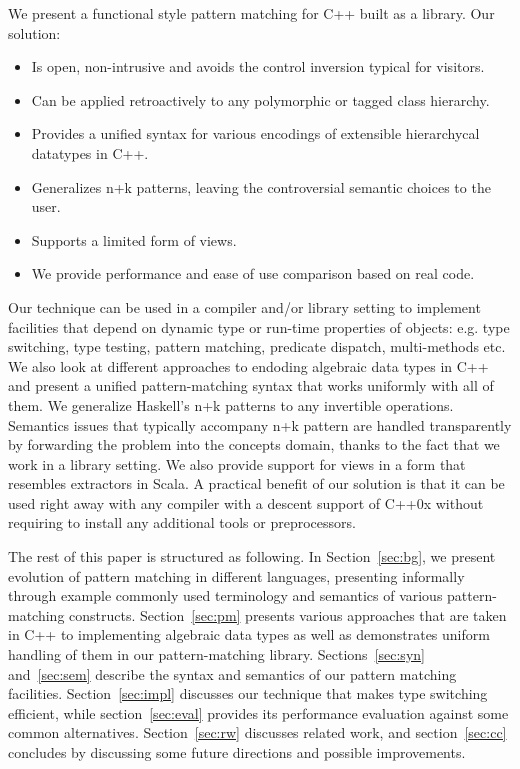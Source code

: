 \documentclass[preprint]{sigplanconf}
\begin{document}
We present a functional style pattern matching for C++ built as a library. Our solution:

  \begin{itemize}
  \item Is open, non-intrusive and avoids the control inversion typical for visitors.
  \item Can be applied retroactively to any polymorphic or tagged class hierarchy.
  \item Provides a unified syntax for various encodings of extensible 
        hierarchycal datatypes in C++.
  \item Generalizes n+k patterns, leaving the controversial semantic choices to the user.
  \item Supports a limited form of views.
  \item We provide performance and ease of use comparison based on real code.
  \end{itemize}

\noindent
Our technique can be used in a compiler and/or library setting to implement 
facilities that depend on dynamic type or run-time properties of objects: e.g. 
type switching, type testing, pattern matching, predicate dispatch, 
multi-methods etc. We also look at different approaches to endoding algebraic 
data types in C++ and present a unified pattern-matching syntax that works 
uniformly with all of them. 
We generalize Haskell's n+k patterns\cite{haskell98} to any invertible operations. 
Semantics issues that typically accompany n+k pattern are handled transparently 
by forwarding the problem into the concepts domain, thanks to the fact that we 
work in a library setting. We also provide support for views in a form that 
resembles extractors in Scala. A practical benefit of our solution is that it 
can be used right away with any compiler with a descent support of C++0x without
requiring to install any additional tools or preprocessors.

The rest of this paper is structured as following. In Section~\ref{sec:bg}, we 
present evolution of pattern matching in different languages, presenting 
informally through example commonly used terminology and semantics of various 
pattern-matching constructs. Section~\ref{sec:pm} presents various approaches 
that are taken in C++ to implementing algebraic data types as well as 
demonstrates uniform handling of them in our pattern-matching library. 
Sections~\ref{sec:syn} and~\ref{sec:sem} describe the syntax and semantics of 
our pattern matching facilities. Section~\ref{sec:impl} discusses our technique 
that makes type switching efficient, while section~\ref{sec:eval} provides its 
performance evaluation against some common alternatives. Section~\ref{sec:rw} 
discusses related work, and section~\ref{sec:cc} concludes by discussing some 
future directions and possible improvements.
\end{document}
